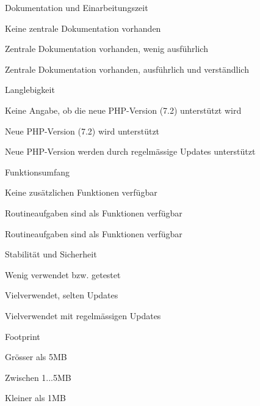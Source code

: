 \begin{itemize*}
\item Dokumentation und Einarbeitungszeit
  \begin{enumerate*}
  \item Keine zentrale Dokumentation vorhanden
  \item Zentrale Dokumentation vorhanden, wenig ausführlich
  \item Zentrale Dokumentation vorhanden, ausführlich und verständlich
  \end{enumerate*}
\item Langlebigkeit
  \begin{enumerate*}
  \item Keine Angabe, ob die neue PHP-Version (7.2) unterstützt wird
  \item Neue PHP-Version (7.2) wird unterstützt
  \item Neue PHP-Version werden durch regelmässige Updates unterstützt
  \end{enumerate*}
\item Funktionsumfang
  \begin{enumerate*}
  \item Keine zusätzlichen Funktionen verfügbar
  \item Routineaufgaben sind als Funktionen verfügbar
  \item Routineaufgaben sind als Funktionen verfügbar
  \end{enumerate*}
\item Stabilität und Sicherheit
  \begin{enumerate*}
  \item Wenig verwendet bzw. getestet
  \item Vielverwendet, selten Updates
  \item Vielverwendet mit regelmässigen Updates
  \end{enumerate*}
\item Footprint
  \begin{enumerate*}
  \item Grösser als 5MB
  \item Zwischen 1...5MB
  \item Kleiner als 1MB
  \end{enumerate*}
\end{itemize*}


